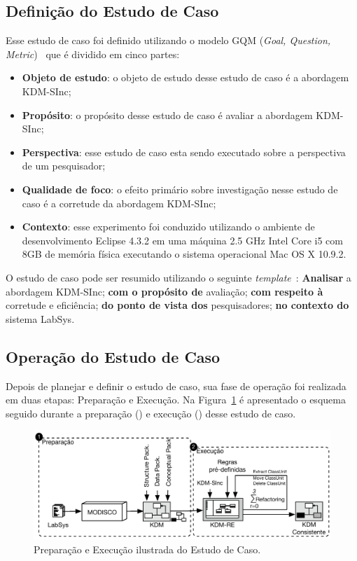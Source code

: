 \subsection{Definição do Estudo de Caso}

Esse estudo de caso foi definido utilizando o modelo GQM (\textit{Goal, Question, Metric})~\cite{Wohlin} que é dividido em cinco partes: 

\begin{itemize}
\item \textbf{Objeto de estudo}: o objeto de estudo desse estudo de caso é a abordagem KDM-SInc;
\item \textbf{Propósito}: o propósito desse estudo de caso é avaliar a abordagem KDM-SInc;
\item \textbf{Perspectiva}: esse estudo de caso esta sendo executado sobre a perspectiva de um pesquisador;
\item \textbf{Qualidade de foco}: o efeito primário sobre investigação nesse estudo de caso é a corretude da abordagem KDM-SInc;
\item \textbf{Contexto}: esse experimento foi conduzido utilizando o ambiente de desenvolvimento Eclipse 4.3.2 em uma máquina 2.5 GHz Intel Core i5 com 8GB de memória física executando o sistema operacional Mac OS X 10.9.2.
\end{itemize}

O estudo de caso pode ser resumido utilizando o seguinte \textit{template}~\cite{Wohlin}: \textbf{Analisar} a abordagem KDM-SInc; \textbf{com o propósito de} avaliação; \textbf{com respeito à} corretude e eficiência; \textbf{do ponto de vista dos} pesquisadores; \textbf{no contexto do} sistema LabSys.

\subsection{Operação do Estudo de Caso}

Depois de planejar e definir o estudo de caso, sua fase de operação foi realizada em duas etapas: Preparação e Execução. Na Figura~\ref{fig:execucao_estudo_de_caso} é apresentado o esquema seguido durante a preparação () e execução () desse estudo de caso.

\begin{figure}[h]
	\centering
	\caption{Preparação e Execução ilustrada do Estudo de Caso.}
	\label{fig:execucao_estudo_de_caso}
	\includegraphics[scale=0.9]{images/planejamentoEstudoDeCaso}
	\fautor
\end{figure}


